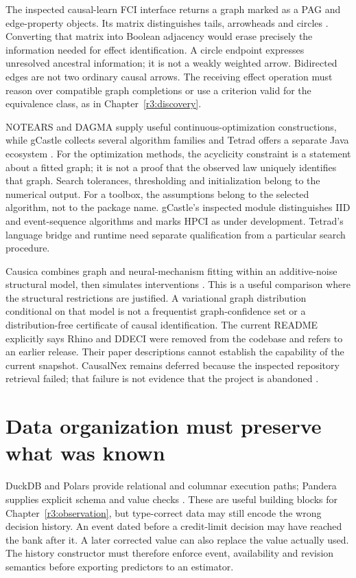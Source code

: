 The inspected causal-learn FCI interface returns a graph marked as a PAG
and edge-property objects. Its matrix distinguishes tails, arrowheads
and circles \citep{sw_causallearn}. Converting that matrix into Boolean
adjacency would erase precisely the information needed for
effect identification. A circle endpoint expresses unresolved ancestral
information; it is not a weakly weighted arrow. Bidirected edges are not
two ordinary causal arrows. The receiving effect operation must reason
over compatible graph completions or use a criterion valid for the
equivalence class, as in Chapter~\ref{r3:discovery}.

NOTEARS and DAGMA supply useful continuous-optimization constructions,
while gCastle collects several algorithm families and Tetrad offers a
separate Java ecosystem \citep{sw_notears,sw_dagma,sw_gcastle,sw_tetrad}.
For the optimization methods, the acyclicity constraint is a statement
about a fitted graph; it is not a proof that the observed law uniquely
identifies that graph. Search tolerances, thresholding and initialization
belong to the numerical output. For a toolbox, the assumptions belong to
the selected algorithm, not to the package name. gCastle's inspected
module distinguishes IID and event-sequence algorithms and marks HPCI
as under development. Tetrad's language bridge and runtime need separate
qualification from a particular search procedure.

Causica combines graph and neural-mechanism fitting within an additive-noise
structural model, then simulates interventions \citep{sw_causica}.
This is a useful comparison where the structural restrictions are justified.
A variational graph distribution conditional on that model is not a
frequentist graph-confidence set or a distribution-free certificate of
causal identification. The current README explicitly says Rhino and
DDECI were removed from the codebase and refers to an earlier release.
Their paper descriptions cannot establish the capability of the current
snapshot. CausalNex remains deferred because the inspected repository
retrieval failed; that failure is not evidence that the project is
abandoned \citep{sw_causalnex}.

\section{Data organization must preserve what was known}
\label{r3:software-data}

DuckDB and Polars provide relational and columnar execution paths;
Pandera supplies explicit schema and value checks
\citep{sw_duckdb,sw_polars,sw_pandera}. These are useful building blocks
for Chapter~\ref{r3:observation}, but type-correct data may still encode
the wrong decision history. An event dated before a credit-limit decision
may have reached the bank after it. A later corrected value can also
replace the value actually used. The history constructor must therefore
enforce event, availability and revision semantics before exporting
predictors to an estimator.

